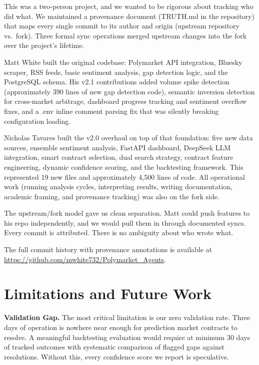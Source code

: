 \documentclass[conference]{IEEEtran}
\begin{document}
This was a two-person project, and we wanted to be rigorous about tracking who did what. We maintained a provenance document (TRUTH.md in the repository) that maps every single commit to its author and origin (upstream repository vs.\ fork). Three formal sync operations merged upstream changes into the fork over the project's lifetime.

Matt White built the original codebase: Polymarket API integration, Bluesky scraper, RSS feeds, basic sentiment analysis, gap detection logic, and the PostgreSQL schema. His v2.1 contributions added volume spike detection (approximately 390 lines of new gap detection code), semantic inversion detection for cross-market arbitrage, dashboard progress tracking and sentiment overflow fixes, and a .env inline comment parsing fix that was silently breaking configuration loading.

Nicholas Tavares built the v2.0 overhaul on top of that foundation: five new data sources, ensemble sentiment analysis, FastAPI dashboard, DeepSeek LLM integration, smart contract selection, dual search strategy, contract feature engineering, dynamic confidence scoring, and the backtesting framework. This represented 19 new files and approximately 4,500 lines of code. All operational work (running analysis cycles, interpreting results, writing documentation, academic framing, and provenance tracking) was also on the fork side.

The upstream/fork model gave us clean separation. Matt could push features to his repo independently, and we would pull them in through documented syncs. Every commit is attributed. There is no ambiguity about who wrote what.

The full commit history with provenance annotations is available at \url{https://github.com/mwhite732/Polymarket_Agents}.

\section{Limitations and Future Work}

\textbf{Validation Gap.} The most critical limitation is our zero validation rate. Three days of operation is nowhere near enough for prediction market contracts to resolve. A meaningful backtesting evaluation would require at minimum 30 days of tracked outcomes with systematic comparison of flagged gaps against resolutions. Without this, every confidence score we report is speculative.
\end{document}
